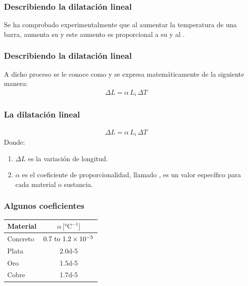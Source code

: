 \documentclass[14pt]{beamer}
\begin{document}
\begin{frame}
\frametitle{Describiendo la dilatación lineal}
Se ha comprobado experimentalmente que al aumentar la temperatura de una barra, aumenta su  \pause y este aumento es proporcional a su  \pause y al .
\end{frame}
\begin{frame}
\frametitle{Describiendo la dilatación lineal}
A dicho proceso se le conoce como  y se expresa matemáticamente de la siguiente manera:
\pause
\begin{align*}
\Delta L = \alpha \, L_{i} \, \Delta T
\end{align*}
\end{frame}
\begin{frame}
\frametitle{La dilatación lineal}
\vspace*{-1cm}
\begin{align*}
\Delta L = \alpha \, L_{i} \, \Delta T
\end{align*}
Donde:
\begin{enumerate}[<+->]
\item $\Delta L$ es la variación de longitud.
\item $\alpha$ es el coeficiente de proporcionalidad, llamado , es un valor específico para cada material o sustancia.
\seti
\end{enumerate}
\end{frame}
\begin{frame}
\frametitle{Algunos coeficientes}
\begin{table}
    \centering
    \small
    \begin{tabular}{| l | c |} \hline
        Material & $\alpha \, \big[\unit{\degreeCelsius}^{-1} \big]$ \\ \hline
        Concreto & $\numrange{0.7}{1.2d-5}$ \\ \hline
        Plata & \num{2.0d-5} \\ \hline
        Oro & \num{1.5d-5} \\ \hline
        Cobre & \num{1.7d-5} \\ \hline
    \end{tabular}
\end{table}
\end{frame}
\end{document}
